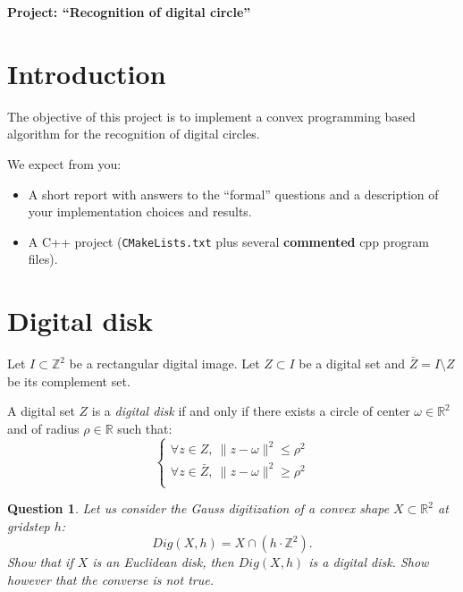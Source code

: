 \documentclass[a4paper, 11pt]{article}
\title{}
\author{}
\date{}
\newtheorem{qu}{Question}
\begin{document}
\begin{center}
	\LARGE \textbf{Project: ``Recognition of digital circle''}
\end{center}

\section*{Introduction}

The objective of this project is to implement a convex programming based algorithm
for the recognition of digital circles. 

We expect from you:
\begin{itemize}
\item A short report with answers to the ``formal'' questions and a
  description of your implementation choices and results.
\item A C++ project (\texttt{CMakeLists.txt} plus several
  \textbf{commented} cpp program files).
\end{itemize}


\section{Digital disk}

Let $I \subset \mathbb{Z}^2$ be a rectangular digital image. Let $Z \subset I$ be 
a digital set and $\bar{Z} = I \setminus Z$ be its complement set.

A digital set $Z$ is a \emph{digital disk} if and only if there exists a circle of 
center $\omega \in \mathbb{R}^2$ and of radius $\rho \in \mathbb{R}$ such that:  
\begin{equation}
  \left\{
  \begin{array}{l}
    \forall z \in Z, \: \| z - \omega \|^2 \leq \rho^2 \\
    \forall z \in \bar{Z}, \: \|  z - \omega \|^2 \geq \rho^2 \\
  \end{array}
  \right.
\end{equation}

\begin{qu}
Let us consider the Gauss digitization of a convex shape $X \subset \mathbb{R}^2$ at gridstep $h$:
\begin{displaymath}
  Dig(X,h) = X\cap (h\cdot \mathbb{Z}^2).
\end{displaymath}
Show that if $X$ is an Euclidean disk, then $Dig(X,h)$ is a digital disk. Show however that 
the converse is not true. 
\end{qu}
\end{document}
